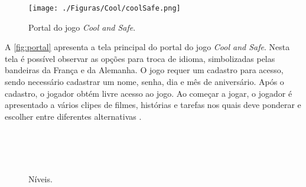 

\begin{figure}[htb]

	\caption{\label{fig:portal}Portal do jogo \textit{Cool and Safe}.}
  \begin{center}%
    \texttt{[image: ./Figuras/Cool/coolSafe.png]}
	\end{center}%

\end{figure}

A \autoref{fig:portal} apresenta a tela principal do portal do jogo \textit{Cool and Safe}. Nesta tela é possível observar as opções para troca de idioma, simbolizadas pelas bandeiras da França e da Alemanha. O jogo requer um cadastro para acesso, sendo necessário cadastrar um nome, senha, dia e mês de aniversário. Após o cadastro, o jogador obtém livre acesso ao jogo. Ao começar a jogar, o jogador é apresentado a vários clipes de filmes, histórias e tarefas nos quais deve ponderar e escolher entre diferentes alternativas \cite{mueller2012web}. 

\begin{figure}%
  \vspace{-5pt}
  \caption{\label{fig:coolniveis}Níveis.\vspace{5pt}}

  \vspace{-3pt}
  \\
  \vspace{-3pt}
  \\
  \vspace{-3pt}
  \\
  \vspace{-3pt}
  \vspace{-8pt}
\end{figure}


